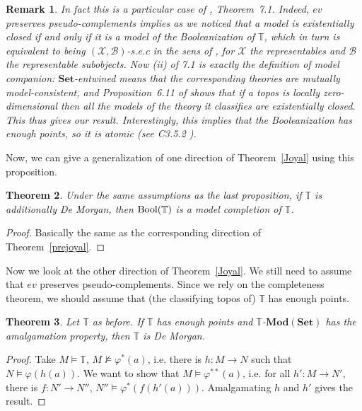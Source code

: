 \documentclass{article}
\newtheorem{theorem}{Theorem}
\newtheorem{remark}[theorem]{Remark}
\newcommand{\T}{\mathbb{T}}
\renewcommand{\phi}{\varphi}
\newcommand{\Set}{\mathbf{Set}}
\newcommand{\Mod}{{\mathbf{Mod}}}
\begin{document}
\begin{remark}
    In fact this is a particular case of \cite{kamsma2024existentially}, Theorem~7.1. Indeed, $ev$ preserves pseudo-complements implies as we noticed that a model is existentially closed if and only if it is a model of the Booleanization of $\T$, which in turn is equivalent to being $(\mathcal{X,B})$-s.e.c in the sens of \cite{kamsma2024existentially}, for $\mathcal{X}$ the representables and $\mathcal{B}$ the representable subobjects. Now (ii) of 7.1 \cite{kamsma2024existentially} is exactly the definition of model companion: $\Set$-entwined means that the corresponding theories are mutually model-consistent, and Proposition~6.11 of \cite{kamsma2024existentially} shows that if a topos is locally zero-dimensional then all the models of the theory it classifies are existentially closed. This thus gives our result. Interestingly, this implies that the Booleanization has enough points, so it is atomic (see C3.5.2 \cite{johnstone2002sketches}). 
\end{remark}

Now, we can give a generalization of one direction of Theorem~\ref{Joyal} using this proposition.

\begin{theorem}
    Under the same assumptions as the last proposition, if $\T$ is additionally De Morgan, then $\textup{Bool}(\T)$ is a model completion of $\T$.
\end{theorem}
\begin{proof}
    Basically the same as the corresponding direction of Theorem~\ref{prejoyal}.
\end{proof}

Now we look at the other direction of Theorem~\ref{Joyal}. We still need to assume that $ev$ preserves pseudo-complements. Since we rely on the completeness theorem, we should assume that (the classifying topos of) $\T$ has enough points.

\begin{theorem}\label{joyal_geom}
    Let $\T$ as before. If $\T$ has enough points and $\T$-$\Mod(\Set)$ has the amalgamation property, then $\T$ is De Morgan.
\end{theorem}
\begin{proof}
    Take $M\models\T$, $M\not\models\phi^*(a)$, i.e. there is $h:M\xrightarrow{}N$ such that $N\models\phi(h(a))$. We want to show that $M\models\phi^{**}(a)$, i.e. for all $h':M\xrightarrow{}N'$, there is $f:N'\xrightarrow{}N''$, $N''\models\phi^*(f(h'(a)))$. Amalgamating $h$ and $h'$ gives the result.
\end{proof}
\end{document}
